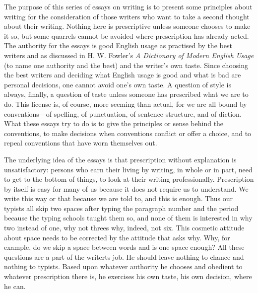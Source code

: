 \documentclass[
    oneside,
    11pt,
]{memoir}
\begin{document}
The purpose of this series of essays on writing is to present some principles about writing for the consideration of those writers who want to take a second thought about their writing. Nothing here is prescriptive unless someone chooses to make it so, but some quarrels cannot be avoided where prescription has already acted. The authority for the essays is good English usage as practised by the best writers and as discussed in H. W. Fowler's \emph{A Dictionary of Modern English Usage} (to name one authority and the best) and the writer's own taste. Since choosing the best writers and deciding what English usage is good and what is bad are personal decisions, one cannot avoid one's own taste. A question of style is always, finally, a question of taste unless someone has prescribed what we are to do. This license is, of course, more seeming than actual, for we are all bound by conventions---of spelling, of punctuation, of sentence structure, and of diction. What these essays try to do is to give the principles or sense behind the conventions, to make decisions when conventions conflict or offer a choice, and to repeal conventions that have worn themselves out.

The underlying idea of the essays is that prescription without explanation is unsatisfactory: persons who earn their living by writing, in whole or in part, need to get to the bottom of things, to look at their writing professionally. Prescription by itself is easy for many of us because it does not require us to understand. We write this way or that because we are told to, and this is enough. Thus our typists all skip two spaces after typing the paragraph number and the period because the typing schools taught them so, and none of them is interested in why two instead of one, why not threes why, indeed, not six. This cosmetic attitude about space needs to be corrected by the attitude that asks why. Why, for example, do we skip a space between words and is one space enough? All these questions are a part of the writerts job. He should leave nothing to chance and nothing to typists. Based upon whatever authority he chooses and obedient to whatever prescription there is, he exercises his own taste, his own decision, where he can.
\end{document}
